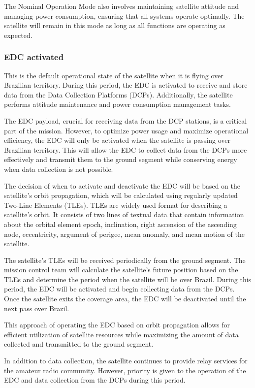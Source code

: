 The Nominal Operation Mode also involves maintaining satellite attitude and managing power consumption, ensuring that all systems operate optimally. The satellite will remain in this mode as long as all functions are operating as expected.

\subsubsection{EDC activated}

This is the default operational state of the satellite when it is flying over Brazilian territory. During this period, the EDC is activated to receive and store data from the Data Collection Platforms (DCPs). Additionally, the satellite performs attitude maintenance and power consumption management tasks.

The EDC payload, crucial for receiving data from the DCP stations, is a critical part of the mission. However, to optimize power usage and maximize operational efficiency, the EDC will only be activated when the satellite is passing over Brazilian territory. This will allow the EDC to collect data from the DCPs more effectively and transmit them to the ground segment while conserving energy when data collection is not possible.

The decision of when to activate and deactivate the EDC will be based on the satellite's orbit propagation, which will be calculated using regularly updated Two-Line Elements (TLEs). TLEs are widely used format for describing a satellite's orbit. It consists of two lines of textual data that contain information about the orbital element epoch, inclination, right ascension of the ascending node, eccentricity, argument of perigee, mean anomaly, and mean motion of the satellite.

The satellite's TLEs will be received periodically from the ground segment. The mission control team will calculate the satellite's future position based on the TLEs and determine the period when the satellite will be over Brazil. During this period, the EDC will be activated and begin collecting data from the DCPs. Once the satellite exits the coverage area, the EDC will be deactivated until the next pass over Brazil.

This approach of operating the EDC based on orbit propagation allows for efficient utilization of satellite resources while maximizing the amount of data collected and transmitted to the ground segment.

In addition to data collection, the satellite continues to provide relay services for the amateur radio community. However, priority is given to the operation of the EDC and data collection from the DCPs during this period.

